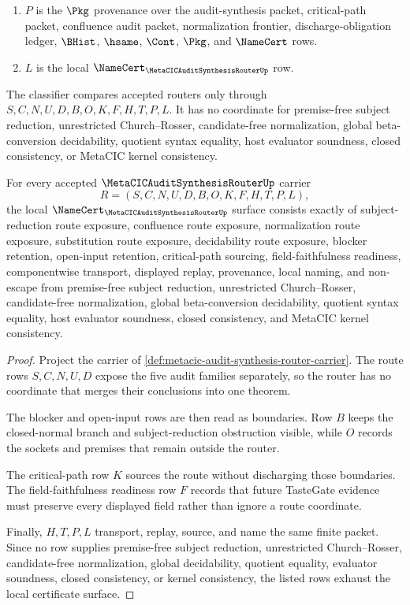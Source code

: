 \begin{definition}
\begin{enumerate}
\item $P$ is the $\Pkg$ provenance over the audit-synthesis packet, critical-path packet, confluence audit packet, normalization frontier, discharge-obligation ledger, $\BHist$, $\hsame$, $\Cont$, $\Pkg$, and $\NameCert$ rows.
\item $L$ is the local $\NameCert_{\MetaCICAuditSynthesisRouterUp}$ row.
\end{enumerate}
The classifier compares accepted routers only through $S,C,N,U,D,B,O,K,F,H,T,P,L$. It has no coordinate for premise-free subject reduction, unrestricted Church--Rosser, candidate-free normalization, global beta-conversion decidability, quotient syntax equality, host evaluator soundness, closed consistency, or MetaCIC kernel consistency.
\end{definition}

\begin{theorem}
\label{thm:metacic-audit-synthesis-router-namecert-obligations}
For every accepted $\MetaCICAuditSynthesisRouterUp$ carrier
$$
R=(S,C,N,U,D,B,O,K,F,H,T,P,L),
$$
the local $\NameCert_{\MetaCICAuditSynthesisRouterUp}$ surface consists exactly of subject-reduction route exposure, confluence route exposure, normalization route exposure, substitution route exposure, decidability route exposure, blocker retention, open-input retention, critical-path sourcing, field-faithfulness readiness, componentwise transport, displayed replay, provenance, local naming, and non-escape from premise-free subject reduction, unrestricted Church--Rosser, candidate-free normalization, global beta-conversion decidability, quotient syntax equality, host evaluator soundness, closed consistency, and MetaCIC kernel consistency.
\end{theorem}
\begin{proof}
Project the carrier of \autoref{def:metacic-audit-synthesis-router-carrier}. The route rows $S,C,N,U,D$ expose the five audit families separately, so the router has no coordinate that merges their conclusions into one theorem.

The blocker and open-input rows are then read as boundaries. Row $B$ keeps the closed-normal branch and subject-reduction obstruction visible, while $O$ records the sockets and premises that remain outside the router.

The critical-path row $K$ sources the route without discharging those boundaries. The field-faithfulness readiness row $F$ records that future TasteGate evidence must preserve every displayed field rather than ignore a route coordinate.

Finally, $H,T,P,L$ transport, replay, source, and name the same finite packet. Since no row supplies premise-free subject reduction, unrestricted Church--Rosser, candidate-free normalization, global decidability, quotient equality, evaluator soundness, closed consistency, or kernel consistency, the listed rows exhaust the local certificate surface.
\end{proof}

